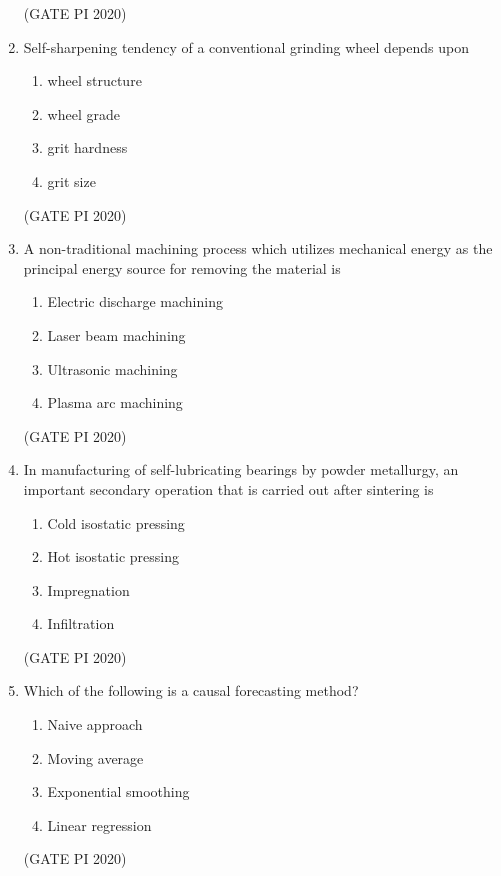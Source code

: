 \documentclass[journal,12pt,onecolumn]{IEEEtran}
\theoremstyle{remark}
\begin{document}
\begin{enumerate}
\hfill (GATE PI 2020)

\item Self-sharpening tendency of a conventional grinding wheel depends upon
\begin{enumerate}
    \item wheel structure
    \item wheel grade
    \item grit hardness
    \item grit size
\end{enumerate}

\hfill (GATE PI 2020)

\item A non-traditional machining process which utilizes mechanical energy as the principal energy source for removing the material is
\begin{enumerate}
    \item Electric discharge machining
    \item Laser beam machining
    \item Ultrasonic machining
    \item Plasma arc machining
\end{enumerate}

\hfill (GATE PI 2020)

\item In manufacturing of self-lubricating bearings by powder metallurgy, an important secondary operation that is carried out after sintering is
\begin{enumerate}
    \item Cold isostatic pressing
    \item Hot isostatic pressing
    \item Impregnation
    \item Infiltration
\end{enumerate}

\hfill (GATE PI 2020)

\item Which of the following is a causal forecasting method?
\begin{enumerate}
    \item Naive approach
    \item Moving average
    \item Exponential smoothing
    \item Linear regression
\end{enumerate}

\hfill (GATE PI 2020)


\end{enumerate}
\end{document}
